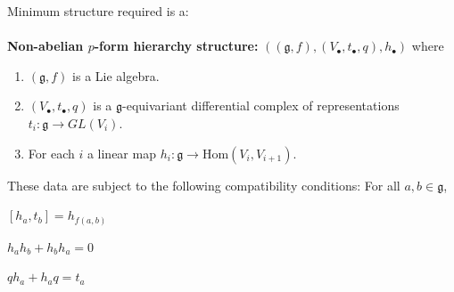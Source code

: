 \documentclass[8pt]{beamer}
\def\mypause{
\pause
} %
\begin{document}
{Minimum structure required is a:\\ 
~\\
{\bf Non-abelian $p$-form hierarchy structure:}
$((\mathfrak g, f), (V_\bullet, t_\bullet, q),  h_\bullet)$ where
\begin{enumerate}
%
\mypause 
%
\item $(\mathfrak g, f)$ is a Lie algebra.
%
\mypause 
%
\item $(V_\bullet,t_\bullet, q)$ is a $\mathfrak g$-equivariant differential complex of representations $t_i : \mathfrak g\to GL(V_i)$.
%
\mypause 
%
\item For each $i$ a linear map $h_i: \mathfrak g \to \mathrm{Hom} (V_i,V_{i+1})$. 
\end{enumerate}
These data are subject to the following compatibility conditions: For all $a,b \in \mathfrak g$,
\begin{description}
%
\mypause 
%
\item[Closure:] $[h_a , t_b] = h_{f(a,b)}$
%
\mypause 
%
\item[Nilpotence:] $h_a h_b + h_b h_a = 0$
%
\mypause 
%
\item[Cartan formula:] $q h_a + h_a q = t_a$
\end{description}

}
\end{document}
